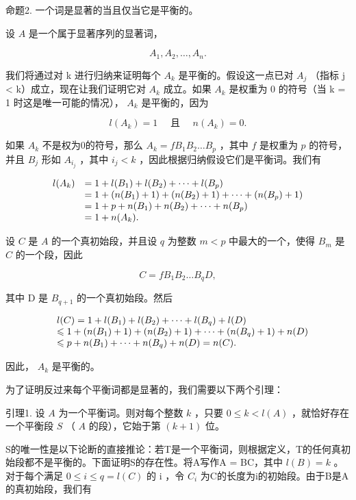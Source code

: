 命题2. 一个词是显著的当且仅当它是平衡的。

设 \(A\) 是一个属于显著序列的显著词，

\[
A _ {1}, A _ {2}, \dots , A _ {n}.
\]

我们将通过对 k 进行归纳来证明每个 \(A_{k}\) 是平衡的。假设这一点已对 \(A_{j}\) （指标 j \textless{} k）成立，现在让我们证明它对 \(A_{k}\) 成立。如果 \(A_{k}\) 是权重为 0 的符号（当 k = 1 时这是唯一可能的情况）， \(A_{k}\) 是平衡的，因为

\[
l (A _ {k}) = 1 \quad \text { 且 } \quad n (A _ {k}) = 0.
\]

如果 \(A_{k}\) 不是权为0的符号，那么 \(A_{k} = fB_{1}B_{2}\ldots B_{p}\) ，其中 \(f\) 是权重为 \(p\) 的符号，并且 \(B_{j}\) 形如 \(A_{i_{j}}\) ，其中 \(i_{j} < k\) ，因此根据归纳假设它们是平衡词。我们有

\[
\begin{array}{r l} l (A _ {k}) & = 1 + l (B _ {1}) + l (B _ {2}) + \dots + l (B _ {p}) \\ & = 1 + (n (B _ {1}) + 1) + (n (B _ {2}) + 1) + \dots + (n (B _ {p}) + 1) \\ & = 1 + p + n (B _ {1}) + n (B _ {2}) + \dots + n (B _ {p}) \\ & = 1 + n (A _ {k}). \end{array}
\]

设 \(C\) 是 \(A\) 的一个真初始段，并且设 \(q\) 为整数 \(m < p\) 中最大的一个，使得 \(B_{m}\) 是 \(C\) 的一个段，因此

\[
C = f B _ {1} B _ {2} \dots B _ {q} D,
\]

其中 D 是 \(B_{q+1}\) 的一个真初始段。然后

\[
\begin{array}{r l} & l (C) = 1 + l (B _ {1}) + l (B _ {2}) + \dots + l (B _ {q}) + l (D) \\ & \leqslant 1 + (n (B _ {1}) + 1) + (n (B _ {2}) + 1) + \dots + (n (B _ {q}) + 1) + n (D) \\ & \leqslant p + n (B _ {1}) + \dots + n (B _ {q}) + n (D) = n (C). \end{array}
\]

因此， \(A_{k}\) 是平衡的。

为了证明反过来每个平衡词都是显著的，我们需要以下两个引理：

引理1. 设 \(A\) 为一个平衡词。则对每个整数 \(k\) ，只要 \(0 \leqslant k < l(A)\) ，就恰好存在一个平衡段 \(S\) （ \(A\) 的段），它始于第 \((k + 1)\) 位。

S的唯一性是以下论断的直接推论：若T是一个平衡词，则根据定义，T的任何真初始段都不是平衡的。下面证明S的存在性。将A写作A = BC，其中 \(l(B) = k\) 。对于每个满足 \(0 \leqslant i \leqslant q = l(C)\) 的 i ，令 \(C_i\) 为C的长度为i的初始段。由于B是A的真初始段，我们有

